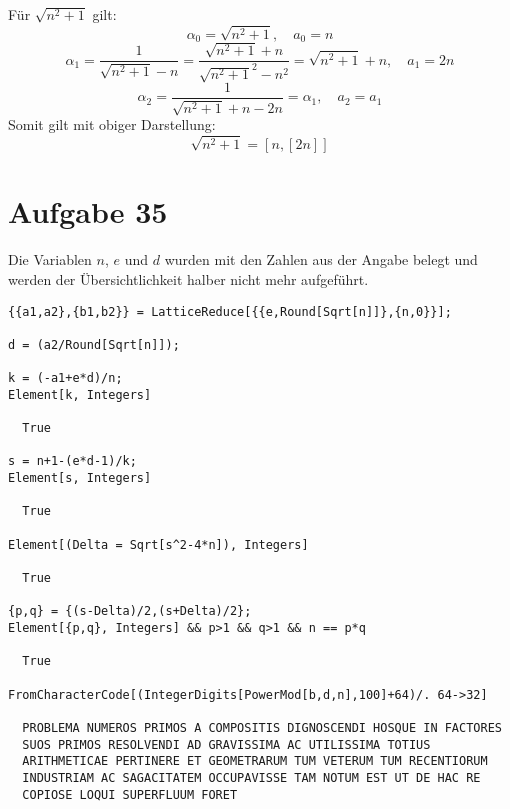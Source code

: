 Für $\sqrt{n^2 + 1}$ gilt:
\[ \alpha_0 = \sqrt{n^2 + 1}, \quad a_0 = n \]
\[ \alpha_1 = \frac{1}{\sqrt{n^2 + 1} - n} = \frac{\sqrt{n^2 + 1} + n}{{\sqrt{n^2 + 1}}^2 - n^2} = \sqrt{n^2 + 1} + n, \quad a_1 = 2n \]
\[ \alpha_2 = \frac{1}{\sqrt{n^2 + 1} + n - 2n} = \alpha_1, \quad a_2 = a_1 \]
Somit gilt mit obiger Darstellung:
\[ \sqrt{n^2 + 1} = [n, [2n]] \]

\section*{Aufgabe 35}
Die Variablen $n$, $e$ und $d$ wurden mit den Zahlen aus der Angabe belegt und
werden der Übersichtlichkeit halber nicht mehr aufgeführt.
\lstset{language=Mathematica}
\begin{lstlisting}
{{a1,a2},{b1,b2}} = LatticeReduce[{{e,Round[Sqrt[n]]},{n,0}}];

d = (a2/Round[Sqrt[n]]);

k = (-a1+e*d)/n;
Element[k, Integers]

  True

s = n+1-(e*d-1)/k;
Element[s, Integers]

  True

Element[(Delta = Sqrt[s^2-4*n]), Integers]

  True

{p,q} = {(s-Delta)/2,(s+Delta)/2};
Element[{p,q}, Integers] && p>1 && q>1 && n == p*q

  True

FromCharacterCode[(IntegerDigits[PowerMod[b,d,n],100]+64)/. 64->32]

  PROBLEMA NUMEROS PRIMOS A COMPOSITIS DIGNOSCENDI HOSQUE IN FACTORES
  SUOS PRIMOS RESOLVENDI AD GRAVISSIMA AC UTILISSIMA TOTIUS
  ARITHMETICAE PERTINERE ET GEOMETRARUM TUM VETERUM TUM RECENTIORUM
  INDUSTRIAM AC SAGACITATEM OCCUPAVISSE TAM NOTUM EST UT DE HAC RE
  COPIOSE LOQUI SUPERFLUUM FORET
\end{lstlisting}
